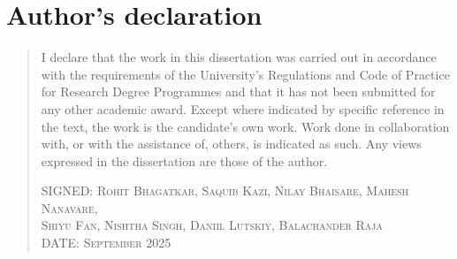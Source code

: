 \chapter*{Author's declaration}

\begin{quote}
I declare that the work in this dissertation was carried out in accordance with the requirements of  the University's Regulations and Code of Practice for Research Degree Programmes and that it has not been submitted for any other academic award. Except where indicated by specific reference in the text, the work is the candidate's own work. Work done in collaboration with, or with the assistance of, others, is indicated as such. Any views expressed in the dissertation are those of the author.

\vspace{1.5cm}
\noindent\textsc{SIGNED: Rohit Bhagatkar, Saquib Kazi, Nilay Bhaisare, Mahesh Nanavare, \\ 
Shiyu Fan, Nishtha Singh, Daniil Lutskiy, Balachander Raja} \\[0.5cm]
\noindent\textsc{DATE: September 2025}

\end{quote}
